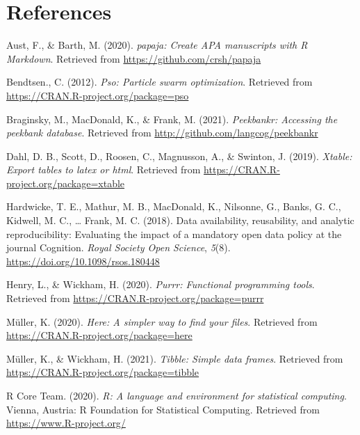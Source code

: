\documentclass[
  english,
  man,floatsintext]{apa6}
\begin{document}
\newpage

\hypertarget{references}{%
\section{References}\label{references}}

\begingroup
\setlength{\parindent}{-0.5in}
\setlength{\leftskip}{0.5in}

\hypertarget{refs}{}
\leavevmode\hypertarget{ref-R-papaja}{}%
Aust, F., \& Barth, M. (2020). \emph{papaja: Create APA manuscripts with R Markdown}. Retrieved from \url{https://github.com/crsh/papaja}

\leavevmode\hypertarget{ref-R-pso}{}%
Bendtsen., C. (2012). \emph{Pso: Particle swarm optimization}. Retrieved from \url{https://CRAN.R-project.org/package=pso}

\leavevmode\hypertarget{ref-R-peekbankr}{}%
Braginsky, M., MacDonald, K., \& Frank, M. (2021). \emph{Peekbankr: Accessing the peekbank database}. Retrieved from \url{http://github.com/langcog/peekbankr}

\leavevmode\hypertarget{ref-R-xtable}{}%
Dahl, D. B., Scott, D., Roosen, C., Magnusson, A., \& Swinton, J. (2019). \emph{Xtable: Export tables to latex or html}. Retrieved from \url{https://CRAN.R-project.org/package=xtable}

\leavevmode\hypertarget{ref-Hardwicke2018}{}%
Hardwicke, T. E., Mathur, M. B., MacDonald, K., Nilsonne, G., Banks, G. C., Kidwell, M. C., \ldots{} Frank, M. C. (2018). Data availability, reusability, and analytic reproducibility: Evaluating the impact of a mandatory open data policy at the journal Cognition. \emph{Royal Society Open Science}, \emph{5}(8). \url{https://doi.org/10.1098/rsos.180448}

\leavevmode\hypertarget{ref-R-purrr}{}%
Henry, L., \& Wickham, H. (2020). \emph{Purrr: Functional programming tools}. Retrieved from \url{https://CRAN.R-project.org/package=purrr}

\leavevmode\hypertarget{ref-R-here}{}%
Müller, K. (2020). \emph{Here: A simpler way to find your files}. Retrieved from \url{https://CRAN.R-project.org/package=here}

\leavevmode\hypertarget{ref-R-tibble}{}%
Müller, K., \& Wickham, H. (2021). \emph{Tibble: Simple data frames}. Retrieved from \url{https://CRAN.R-project.org/package=tibble}

\leavevmode\hypertarget{ref-R-base}{}%
R Core Team. (2020). \emph{R: A language and environment for statistical computing}. Vienna, Austria: R Foundation for Statistical Computing. Retrieved from \url{https://www.R-project.org/}
\end{document}
